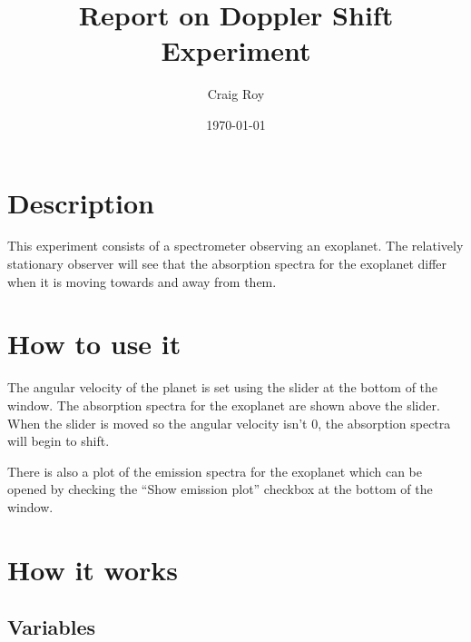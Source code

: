 \documentclass[11pt]{article}
\title{Report on Doppler Shift Experiment}
\author{Craig Roy}
\date{\today}
\begin{document}
\maketitle


\section*{Description}
\label{sec-1}

This experiment consists of a spectrometer observing an exoplanet. The
relatively stationary observer will see that the absorption spectra
for the exoplanet differ when it is moving towards and away from them.
\section*{How to use it}
\label{sec-2}

The angular velocity of the planet is set using the slider at the
bottom of the window. The absorption spectra for the exoplanet
are shown above the slider. When the slider is moved so the angular
velocity isn't 0, the absorption spectra will begin to shift.

There is also a plot of the emission spectra for the exoplanet which
can be opened by checking the ``Show emission plot'' checkbox at the
bottom of the window.
\section*{How it works}
\label{sec-3}
\subsection*{Variables}
\label{sec-3-1}
\end{document}
